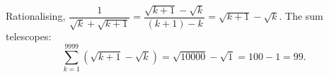 Rationalising, $\dfrac{1}{\sqrt k+\sqrt{k+1}}=\dfrac{\sqrt{k+1}-\sqrt k}{(k+1)-k}=\sqrt{k+1}-\sqrt k$. The sum telescopes:
\[
\sum_{k=1}^{9999}\left(\sqrt{k+1}-\sqrt k\right)=\sqrt{10000}-\sqrt1=100-1=\boxed{99}.
\]

